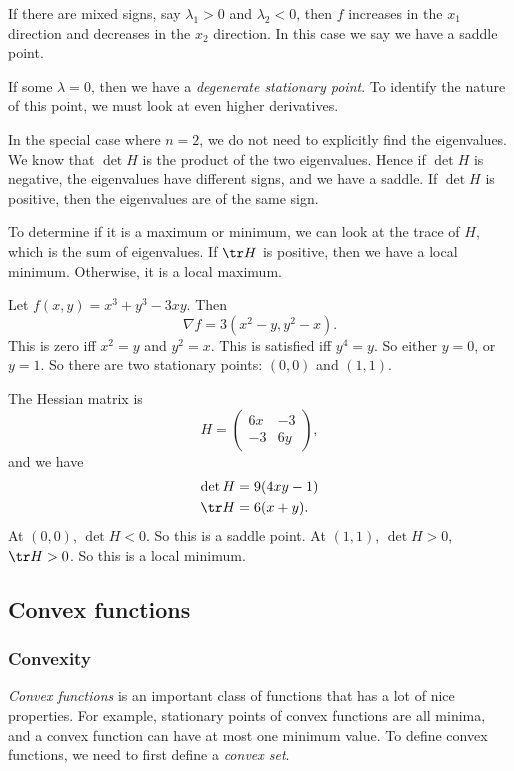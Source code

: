 \documentclass[a4paper]{article}
\begin{document}
If there are mixed signs, say $\lambda_1 > 0$ and $\lambda_2 < 0$, then $f$ increases in the $x_1$ direction and decreases in the $x_2$ direction. In this case we say we have a saddle point.

If some $\lambda = 0$, then we have a \emph{degenerate stationary point}. To identify the nature of this point, we must look at even higher derivatives.

In the special case where $n = 2$, we do not need to explicitly find the eigenvalues. We know that $\det H$ is the product of the two eigenvalues. Hence if $\det H$ is negative, the eigenvalues have different signs, and we have a saddle. If $\det H$ is positive, then the eigenvalues are of the same sign.

To determine if it is a maximum or minimum, we can look at the trace of $H$, which is the sum of eigenvalues. If $\tr H$ is positive, then we have a local minimum. Otherwise, it is a local maximum.

\begin{eg}
  Let $f(x, y) = x^3 + y^3 - 3xy$. Then
  \[
    \nabla f = 3(x^2 - y, y^2 - x).
  \]
  This is zero iff $x^2 = y$ and $y^2 = x$. This is satisfied iff $y^4 = y$. So either $y = 0$, or $y = 1$. So there are two stationary points: $(0, 0)$ and $(1, 1)$.

  The Hessian matrix is
  \[
    H =
    \begin{pmatrix}
      6x & -3\\
      -3 & 6y
    \end{pmatrix},
  \]
  and we have
  \begin{align*}
    \det H &= 9(4xy - 1)\\
    \tr H &= 6(x + y).
  \end{align*}
  At $(0, 0)$, $\det H < 0$. So this is a saddle point. At $(1, 1)$, $\det H > 0$, $\tr H > 0$. So this is a local minimum.
\end{eg}
\subsection{Convex functions}
\subsubsection{Convexity}
\emph{Convex functions} is an important class of functions that has a lot of nice properties. For example, stationary points of convex functions are all minima, and a convex function can have at most one minimum value. To define convex functions, we need to first define a \emph{convex set}.
\end{document}
